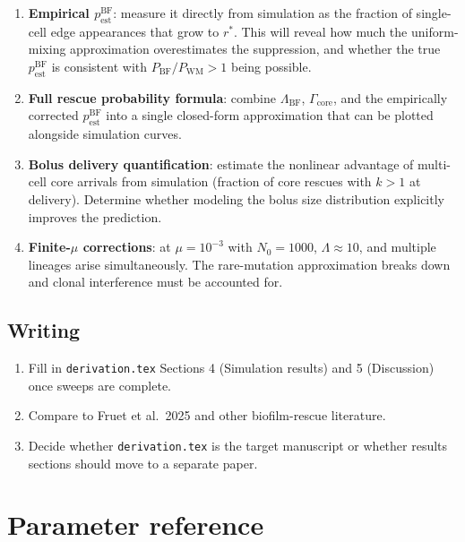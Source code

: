 \documentclass[12pt]{article}
\begin{document}
\begin{enumerate}
    \item \textbf{Empirical $p_{\text{est}}^{\text{BF}}$}: measure it
    directly from simulation as the fraction of single-cell edge appearances
    that grow to $r^*$. This will reveal how much the uniform-mixing
    approximation overestimates the suppression, and whether the true
    $p_{\text{est}}^{\text{BF}}$ is consistent with $P_{\text{BF}}/P_{\text{WM}}
    > 1$ being possible.

    \item \textbf{Full rescue probability formula}: combine
    $\Lambda_{\text{BF}}$, $\Gamma_{\text{core}}$, and the empirically
    corrected $p_{\text{est}}^{\text{BF}}$ into a single closed-form
    approximation that can be plotted alongside simulation curves.

    \item \textbf{Bolus delivery quantification}: estimate the nonlinear
    advantage of multi-cell core arrivals from simulation (fraction of
    core rescues with $k > 1$ at delivery). Determine whether modeling
    the bolus size distribution explicitly improves the prediction.

    \item \textbf{Finite-$\mu$ corrections}: at $\mu = 10^{-3}$ with
    $N_0 = 1000$, $\Lambda \approx 10$, and multiple lineages arise
    simultaneously. The rare-mutation approximation breaks down and
    clonal interference must be accounted for.
\end{enumerate}

\subsection{Writing}

\begin{enumerate}
    \item Fill in \texttt{derivation.tex} Sections 4 (Simulation results)
    and 5 (Discussion) once sweeps are complete.
    \item Compare to Fruet et al.\ 2025 and other biofilm-rescue literature.
    \item Decide whether \texttt{derivation.tex} is the target manuscript
    or whether results sections should move to a separate paper.
\end{enumerate}


\section{Parameter reference}
\label{sec:params}
\end{document}
